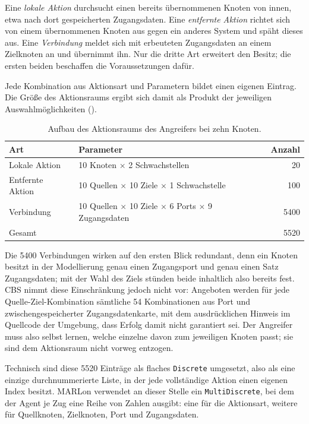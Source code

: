 Eine \emph{lokale Aktion} durchsucht einen bereits übernommenen Knoten von
innen, etwa nach dort gespeicherten Zugangsdaten. Eine \emph{entfernte Aktion}
richtet sich von einem übernommenen Knoten aus gegen ein anderes System und
späht dieses aus. Eine \emph{Verbindung} meldet sich mit erbeuteten
Zugangsdaten an einem Zielknoten an und übernimmt ihn. Nur die dritte Art
erweitert den Besitz; die ersten beiden beschaffen die Voraussetzungen dafür.

Jede Kombination aus Aktionsart und Parametern bildet einen eigenen Eintrag.
Die Größe des Aktionsraums ergibt sich damit als Produkt der jeweiligen
Auswahlmöglichkeiten ().

\begin{table}[H]
  \centering
  \caption[Aufbau des Aktionsraums]{Aufbau des Aktionsraums des Angreifers bei
  zehn Knoten.}
  \label{tab:aktionsraum}
  \begin{tabular}{llr}
    \toprule
    Art & Parameter & Anzahl \\
    \midrule
    Lokale Aktion   & 10 Knoten $\times$ 2 Schwachstellen & 20 \\
    Entfernte Aktion & 10 Quellen $\times$ 10 Ziele $\times$ 1 Schwachstelle & 100 \\
    Verbindung      & 10 Quellen $\times$ 10 Ziele $\times$ 6 Ports $\times$ 9 Zugangsdaten & 5400 \\
    \midrule
    Gesamt          &  & 5520 \\
    \bottomrule
  \end{tabular}
\end{table}

Die 5400 Verbindungen wirken auf den ersten Blick redundant, denn ein Knoten
besitzt in der Modellierung genau einen Zugangsport und genau einen Satz
Zugangsdaten; mit der Wahl des Ziels stünden beide inhaltlich also bereits
fest. \ac{CBS} nimmt diese Einschränkung jedoch nicht vor:
Angeboten werden für jede Quelle-Ziel-Kombination sämtliche 54 Kombinationen
aus Port und zwischengespeicherter Zugangsdatenkarte, mit dem ausdrücklichen
Hinweis im Quellcode der Umgebung, dass Erfolg damit nicht garantiert sei. Der
Angreifer muss also selbst lernen, welche einzelne davon zum jeweiligen Knoten
passt; sie sind dem Aktionsraum nicht vorweg entzogen.

Technisch sind diese 5520 Einträge als flaches \texttt{Discrete} umgesetzt,
also als eine einzige durchnummerierte Liste, in der jede vollständige Aktion
einen eigenen Index besitzt. MARLon verwendet an dieser Stelle ein
\texttt{MultiDiscrete}, bei dem der Agent je Zug eine Reihe von Zahlen ausgibt:
eine für die Aktionsart, weitere für Quellknoten, Zielknoten, Port und
Zugangsdaten.

